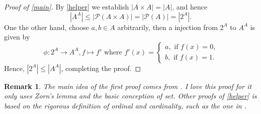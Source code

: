 \documentclass[12pt]{article}
\theoremstyle{mythm}
\newtheorem*{remark}{Remark}
\newcommand\pp{\mathcal{P}}
\begin{document}
\begin{proof}[Proof of \cref{main}]
By \cref{helper} we establish $|A \times A| = |A|$,
and hence 
$$
|A^A| \leq |\pp(A \times A)| = |\pp(A)| = |2^A|.
$$
One the other hand, choose $a,b \in A$ arbitrarily, then a injection 
from $2^A$ to $A^A$ is given by 
$$
\phi : 2^A \to A^A, f \mapsto f' \text{ where }
f'(x) = \begin{cases}
    a, \text{ if $f(x) = 0$,} \\
    b, \text{ if $f(x) = 1$.}
\end{cases}
$$
Hence, $|2^A| \leq |A^A|$, completing the proof.
\end{proof}

\begin{remark}
    The main idea of the first proof comes from \cite{Dong88}.
    I love this proof for it only uses \textit{Zorn's lemma}
    and the basic conception of set. 
    Other proofs of \cref{helper} is based on the rigorous definition of 
    \textit{ordinal} and \textit{cardinality}, such 
    as the one in \cite{Li19}.
     
\end{remark}


\end{document}
